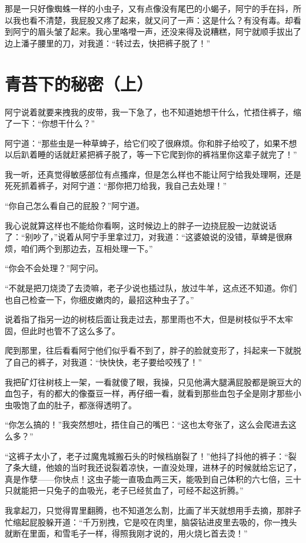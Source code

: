 那是一只好像蜘蛛一样的小虫子，又有点像没有尾巴的小蝎子，阿宁的手在抖，所以我也看不清楚，我屁股又疼了起来，就又问了一声：这是什么？有没有毒。却看到阿宁的眉头皱了起来。我心里咯噔一声，还没来得及说糟糕，阿宁就顺手拔出了边上潘子腰里的刀，对我道：“转过去，快把裤子脱了！”

\chapter{青苔下的秘密（上）}

阿宁说着就要来拽我的皮带，我一下急了，也不知道她想干什么，忙捂住裤子，缩了一下：“你想干什么？”

阿宁道：“那些虫是一种草蜱子，给它们咬了很麻烦。你和胖子给咬了，如果不想以后趴着睡的话就赶紧把裤子脱了，等一下它爬到你的裤裆里你这辈子就完了！”

我一听，还真觉得敏感部位有点搔痒，但是怎么样也不能让阿宁给我处理啊，还是死死抓着裤子，对阿宁道：“那你把刀给我，我自己去处理！”

“你自己怎么看自己的屁股？”阿宁道。

我心说就算这样也不能给你看啊，这时候边上的胖子一边挠屁股一边就说话了：“别吵了，”说着从阿宁手里拿过刀，对我道：“这婆娘说的没错，草蜱是很麻烦，咱们两个到那边去，互相处理一下。”

“你会不会处理？”阿宁问。

“不就是把刀烧烫了去烫嘛，老子少说也插过队，放过牛羊，这点还不知道。你们也自己检查一下，你细皮嫩肉的，最招这种虫子了。”

说着指了指另一边的树枝后面让我走过去，那里雨也不大，但是树枝似乎不太牢固，但此时也管不了这么多了。

爬到那里，往后看看阿宁他们似乎看不到了，胖子的脸就变形了，抖起来一下就脱了自己的裤子，对我道：“快快快，老子要给咬残了！”

我把矿灯往树枝上一架，一看就傻了眼，我操，只见他满大腿满屁股都是豌豆大的血包子，有的都大的像蚕豆一样，再仔细一看，就看到那些血包子全是刚才那些小虫吸饱了血的肚子，都涨得透明了。

“你怎么搞的！”我突然想吐，捂住自己的嘴巴：“这也太夸张了，这么会爬进去这么多？”

“这裤子太小了，老子过魔鬼城搬石头的时候档崩裂了！”他抖了抖他的裤子：“裂了条大缝，他娘的当时我还说裂着凉快，一直没处理，进林子的时候就给忘记了，真是作孽——你快点！这虫子能一直吸血两三天，能吸到自己体积的六七倍，三十只就能把一只兔子的血吸光，老子已经贫血了，可经不起这折腾。”

我拿起刀，只觉得胃里翻腾，也不知道怎么割，比画了半天就想用手去摘，那胖子忙缩起屁股躲开道：“千万别拽，它是咬在肉里，脑袋钻进皮里去吸的，你一拽头就断在里面，和雪毛子一样，得照我刚才说的，用火烧匕首去烫！”

